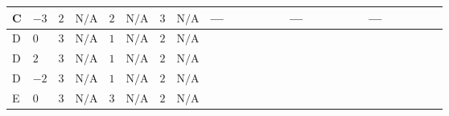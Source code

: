 \documentclass[8pt]{article}
\begin{document}
\begin{landscape}
\begin{longtable}{@{}llcccccc >{\raggedright\arraybackslash}p{0.21\linewidth} >{\raggedright\arraybackslash}p{0.21\linewidth} >{\raggedright\arraybackslash}p{0.21\linewidth}@{}}
C & $-3$ & $2$ & $\text{N/A}$ & $2$ & $\text{N/A}$ & $3$ & $\text{N/A}$ & --- & --- & --- \\
\midrule
D & $0$ & $3$ & $\text{N/A}$ & $1$ & $\text{N/A}$ & $2$ & $\text{N/A}$ & \scriptsize\adjustbox{max width=\linewidth}{$\begin{gathered} +3 {\lambda_{HS_1}^{(A)}}^2\end{gathered}$} & \scriptsize\adjustbox{max width=\linewidth}{$\begin{gathered} +12 {\lambda_{S_1}^{(1)}} {\lambda_{S_1}^{(A)}}\end{gathered}$} & \scriptsize\adjustbox{max width=\linewidth}{$\begin{gathered} +20 {\lambda_{S_1}^{(A)}}^2\end{gathered}$} \\
\midrule
D & $2$ & $3$ & $\text{N/A}$ & $1$ & $\text{N/A}$ & $2$ & $\text{N/A}$ & \scriptsize\adjustbox{max width=\linewidth}{$\begin{gathered} +3 {\lambda_{HS_1}^{(A)}}^2\end{gathered}$} & \scriptsize\adjustbox{max width=\linewidth}{$\begin{gathered} +12 {\lambda_{S_1}^{(1)}} {\lambda_{S_1}^{(A)}}\end{gathered}$} & \scriptsize\adjustbox{max width=\linewidth}{$\begin{gathered} +20 {\lambda_{S_1}^{(A)}}^2\end{gathered}$} \\
\midrule
D & $-2$ & $3$ & $\text{N/A}$ & $1$ & $\text{N/A}$ & $2$ & $\text{N/A}$ & \scriptsize\adjustbox{max width=\linewidth}{$\begin{gathered} +3 {\lambda_{HS_1}^{(A)}}^2\end{gathered}$} & \scriptsize\adjustbox{max width=\linewidth}{$\begin{gathered} +12 {\lambda_{S_1}^{(1)}} {\lambda_{S_1}^{(A)}}\end{gathered}$} & \scriptsize\adjustbox{max width=\linewidth}{$\begin{gathered} +20 {\lambda_{S_1}^{(A)}}^2\end{gathered}$} \\
\midrule
E & $0$ & $3$ & $\text{N/A}$ & $3$ & $\text{N/A}$ & $2$ & $\text{N/A}$ & \scriptsize\adjustbox{max width=\linewidth}{$\begin{gathered} +3 {\lambda_{HS_1}^{(A)}}^2\end{gathered}$} & \scriptsize\adjustbox{max width=\linewidth}{$\begin{gathered} +12 {\lambda_{S_1}^{(1)}} {\lambda_{S_1}^{(A)}}\end{gathered}$} & \scriptsize\adjustbox{max width=\linewidth}{$\begin{gathered} +20 {\lambda_{S_1}^{(A)}}^2\end{gathered}$} \\

\end{longtable}
\end{landscape}
\end{document}
